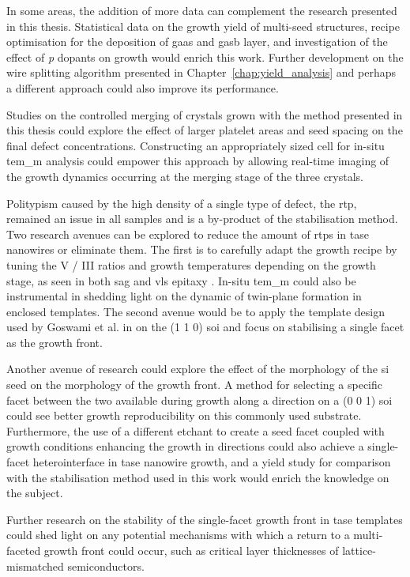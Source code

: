 In some areas, the addition of more data can complement the research presented in this thesis. Statistical data on the growth yield of multi-seed structures, recipe optimisation for the deposition of \acf{gaas} and \acf{gasb} layer, and investigation of the effect of \textit{p} dopants on growth would enrich this work. Further development on the wire splitting algorithm presented in Chapter~\ref{chap:yield_analysis} and perhaps a different approach could also improve its performance. 

Studies on the controlled merging of crystals grown with the method presented in this thesis could explore the effect of larger platelet areas and seed spacing on the final defect concentrations. Constructing an appropriately sized cell for in-situ \acf{tem_m} analysis could empower this approach by allowing real-time imaging of the growth dynamics occurring at the merging stage of the three crystals.

Politypism caused by the high density of a single type of defect, the \acf{rtp}, remained an issue in all samples and is a by-product of the  stabilisation method. Two research avenues can be explored to reduce the amount of \acs{rtp}s in \acs{tase} nanowires or eliminate them. The first is to carefully adapt the growth recipe by tuning the V / III ratios and growth temperatures depending on the growth stage, as seen in both \acf{sag} \cite{Chi2013} and \acf{vls} epitaxy \cite{Joyce2007}. In-situ \acs{tem_m} could also be instrumental in shedding light on the dynamic of twin-plane formation in enclosed templates. The second avenue would be to apply the template design used by Goswami et al. in \cite{Goswami2020} on the \hkl(1 1 0) \acs{soi} and focus on stabilising a single  facet as the growth front.

Another avenue of research could explore the effect of the morphology of the \acl{si} seed on the morphology of the growth front. A method for selecting a specific  facet between the two available during growth along a  direction on a \hkl(0 0 1) \acs{soi} could see better growth reproducibility on this commonly used substrate. Furthermore, the use of a different etchant to create a  seed facet coupled with growth conditions enhancing the growth in  directions could also achieve a single-facet heterointerface in \acs{tase} nanowire growth, and a yield study for comparison with the  stabilisation method used in this work would enrich the knowledge on the subject.

Further research on the stability of the single-facet growth front in \acs{tase} templates could shed light on any potential mechanisms with which a return to a multi-faceted growth front could occur, such as critical layer thicknesses of lattice-mismatched semiconductors.